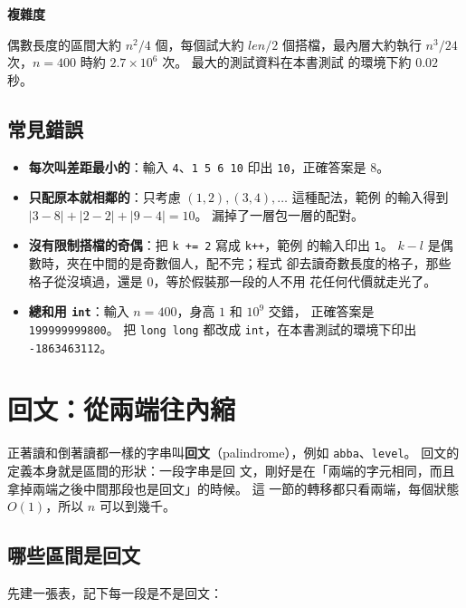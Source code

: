 \textbf{複雜度}

偶數長度的區間大約 $n^2/4$ 個，每個試大約 $len/2$ 個搭檔，最內層大約執行
$n^3/24$ 次，$n = 400$ 時約 $2.7 \times 10^6$ 次。 最大的測試資料在本書測試
的環境下約 $0.02$ 秒。

\subsection{常見錯誤}

\begin{itemize}
\item \textbf{每次叫差距最小的}：輸入 \texttt{4}、\texttt{1 5 6 10} 印出
\texttt{10}，正確答案是 $8$。
\item \textbf{只配原本就相鄰的}：只考慮 $(1, 2), (3, 4), \ldots$ 這種配法，範例
的輸入得到 $|3 - 8| + |2 - 2| + |9 - 4| = 10$。 漏掉了一層包一層的配對。
\item \textbf{沒有限制搭檔的奇偶}：把 \texttt{k += 2} 寫成 \texttt{k++}，範例
的輸入印出 \texttt{1}。 $k - l$ 是偶數時，夾在中間的是奇數個人，配不完；程式
卻去讀奇數長度的格子，那些格子從沒填過，還是 $0$，等於假裝那一段的人不用
花任何代價就走光了。
\item \textbf{總和用 \texttt{int}}：輸入 $n = 400$，身高 $1$ 和 $10^9$ 交錯，
正確答案是 \texttt{199999999800}。 把 \texttt{long long} 都改成
\texttt{int}，在本書測試的環境下印出 \texttt{-1863463112}。
\end{itemize}

\section{回文：從兩端往內縮}
\label{sec:ivdp-pal}

正著讀和倒著讀都一樣的字串叫\textbf{回文}（palindrome），例如
\texttt{abba}、\texttt{level}。 回文的定義本身就是區間的形狀：一段字串是回
文，剛好是在「兩端的字元相同，而且拿掉兩端之後中間那段也是回文」的時候。 這
一節的轉移都只看兩端，每個狀態 $O(1)$，所以 $n$ 可以到幾千。

\subsection{哪些區間是回文}

先建一張表，記下每一段是不是回文：

\begin{center}
\end{center}

